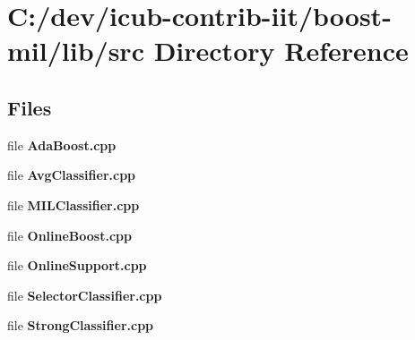 \section{C\+:/dev/icub-\/contrib-\/iit/boost-\/mil/lib/src Directory Reference}
\label{dir_a065c5f60305fee3569f887679366939}
\subsection*{Files}
\begin{DoxyCompactItemize}
\item 
file {\bfseries Ada\+Boost.\+cpp}
\item 
file {\bfseries Avg\+Classifier.\+cpp}
\item 
file {\bfseries M\+I\+L\+Classifier.\+cpp}
\item 
file {\bfseries Online\+Boost.\+cpp}
\item 
file {\bfseries Online\+Support.\+cpp}
\item 
file {\bfseries Selector\+Classifier.\+cpp}
\item 
file {\bfseries Strong\+Classifier.\+cpp}
\end{DoxyCompactItemize}
